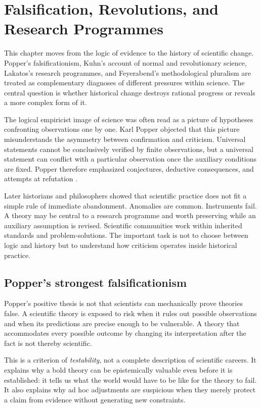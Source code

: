 \chapter{Falsification, Revolutions, and Research Programmes}
\label{ch:change}

\begin{chapterguide}
This chapter moves from the logic of evidence to the history of scientific
change. Popper's falsificationism, Kuhn's account of normal and revolutionary
science, Lakatos's research programmes, and Feyerabend's methodological
pluralism are treated as complementary diagnoses of different pressures within
science. The central question is whether historical change destroys rational
progress or reveals a more complex form of it.
\end{chapterguide}

The logical empiricist image of science was often read as a picture of
hypotheses confronting observations one by one. Karl Popper objected that this
picture misunderstands the asymmetry between confirmation and criticism.
Universal statements cannot be conclusively verified by finite observations,
but a universal statement can conflict with a particular observation once the
auxiliary conditions are fixed. Popper therefore emphasized conjectures,
deductive consequences, and attempts at refutation \citep{popper1959}.

Later historians and philosophers showed that scientific practice does not fit a
simple rule of immediate abandonment. Anomalies are common. Instruments fail.
A theory may be central to a research programme and worth preserving while an
auxiliary assumption is revised. Scientific communities work within inherited
standards and problem-solutions. The important task is not to choose between
logic and history but to understand how criticism operates inside historical
practice.

\section{Popper's strongest falsificationism}

Popper's positive thesis is not that scientists can mechanically prove theories
false. A scientific theory is exposed to risk when it rules out possible
observations and when its predictions are precise enough to be vulnerable. A
theory that accommodates every possible outcome by changing its interpretation
after the fact is not thereby scientific.

This is a criterion of \emph{testability}, not a complete description of
scientific careers. It explains why a bold theory can be epistemically
valuable even before it is established: it tells us what the world would have
to be like for the theory to fail. It also explains why ad hoc adjustments are
suspicious when they merely protect a claim from evidence without generating
new constraints.

